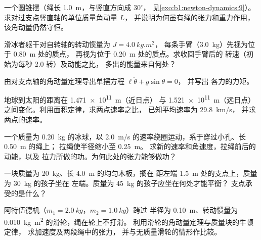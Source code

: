 \begin{exercise}[$\star$]\label{exo:b1:angular-momentum:3}
一个圆锥摆（绳长 \qty{1.0}{m}，与竖直方向成 $30^\circ$，
见\cref{exo:b1:newton-dynamics:9}）。求对过支点竖直轴的单位质量角动量 $L$，
并说明为何虽有绳的张力和重力作用，
该角动量仍然守恒。
\end{exercise}

\begin{exercise}[$\star$]\label{exo:b1:angular-momentum:4}
滑冰者躯干对自转轴的转动惯量为 $J = \qty{4.0}{kg.m^2}$，
每条手臂（\qty{3.0}{kg}）先视为位于 \qty{0.80}{m} 处的质点，
再视为位于 \qty{0.20}{m} 处的质点。求收回手臂后的
转速（初始为每秒 \qty{2.0}{} 转）及动能之比，
多出的能量来自何处？
\end{exercise}

\begin{exercise}[$\star\star$]\label{exo:b1:angular-momentum:5}
由对支点轴的角动量定理导出单摆方程 $\ell\ddot\theta + g\sin\theta = 0$，
并写出
各力的力矩。
\end{exercise}

\begin{exercise}[$\star\star$]\label{exo:b1:angular-momentum:6}
地球到太阳的距离在 \qty{1.471e11}{m}（近日点）
与 \qty{1.521e11}{m}（远日点）之间变化。利用面积定律，求两点速率之比，
已知平均速率为 \qty{29.8}{km/s}，
并求两点的速率。
\end{exercise}

\begin{exercise}[$\star\star$]\label{exo:b1:angular-momentum:7}
一个质量为 \qty{0.20}{kg} 的冰球，以 \qty{2.0}{m/s} 的速率绕圈运动，系于穿过小孔、长 \qty{0.50}{m} 的绳上；
拉绳使半径缩小至 \qty{0.25}{m}。
求新的速率和角速度，拉绳前后的动能，以及
拉力所做的功。为何此处的张力能够做功？
\end{exercise}

\begin{exercise}[$\star\star$]\label{exo:b1:angular-momentum:8}
一块质量为 \qty{20}{kg}、长 \qty{4.0}{m} 的均匀木板，搁在
距左端 \qty{1.5}{m} 处的支点上，质量为 \qty{30}{kg} 的孩子坐在
左端。质量为 \qty{45}{kg} 的孩子应坐在何处才能平衡？
支点承受的是什么？
\end{exercise}

\begin{exercise}[$\star\star$]\label{exo:b1:angular-momentum:9}
阿特伍德机（$m_1 = \qty{2.0}{kg}$，$m_2 = \qty{1.0}{kg}$）跨过
半径为 \qty{0.10}{m}、转动惯量为 \qty{0.010}{kg.m^2} 的滑轮，绳在轮上不打滑。
利用滑轮的角动量定理与质量块的牛顿定律，
求加速度及两段绳中的张力，
并与无质量滑轮的情形作比较。
\end{exercise}

